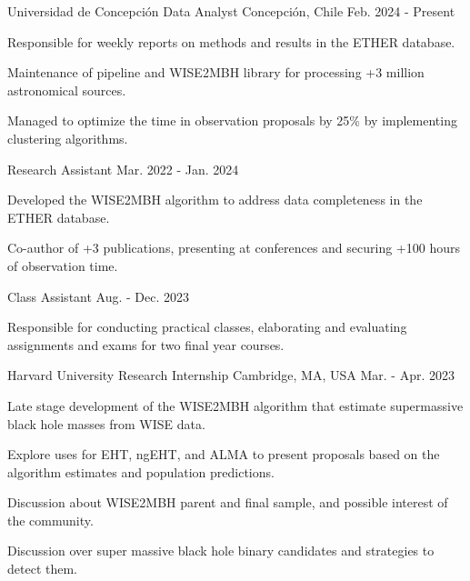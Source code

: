 
\begin{cventries}

\cventry
    {Universidad de Concepción}
    {Data Analyst}
    {Concepción, Chile}
    {Feb. 2024 - Present}
    {
      \begin{cvitems}
        \item{Responsible for weekly reports on methods and results in the ETHER database.}
        \item{Maintenance of pipeline and WISE2MBH library for processing +3 million astronomical sources.}
        \item{Managed to optimize the time in observation proposals by 25\% by implementing clustering algorithms.}
      \end{cvitems}
      \vspace{1em}
    }

  \cventryprevrole
    {Research Assistant}
    {Mar. 2022 - Jan. 2024}
    {
      \begin{cvitems}
        \item{Developed the WISE2MBH algorithm to address data completeness in the ETHER database.}
        \item{Co-author of +3 publications, presenting at conferences and securing +100 hours of observation time.}
      \end{cvitems}
      \vspace{1em}
    }

  \cventryprevrole
    {Class Assistant}
    {Aug. - Dec. 2023}
    {
      \begin{cvitems}
        \item{Responsible for conducting practical classes, elaborating and evaluating assignments and exams for two final year courses.}
      \end{cvitems}
      \vspace{1em}
    }

  \cventry
    {Harvard University}
    {Research Internship}
    {Cambridge, MA, USA}
    {Mar. - Apr. 2023}
    {
      \begin{cvitems}
        \item{Late stage development of the WISE2MBH algorithm that estimate supermassive black hole masses from WISE data.}
        \item{Explore uses for EHT, ngEHT, and ALMA to present proposals based on the algorithm estimates and population predictions.}
        \item {Discussion about WISE2MBH parent and final sample, and possible interest of the community.}
        \item{Discussion over super massive black hole binary candidates and strategies to detect them.}
      \end{cvitems}
      \vspace{1em}
    }


\end{cventries}
